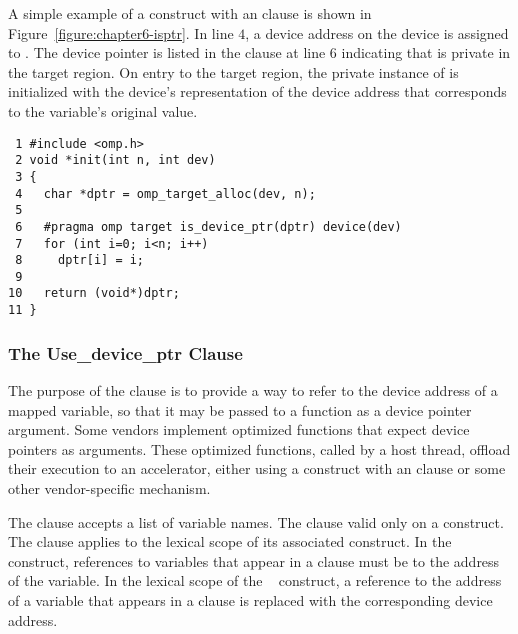 A simple example of a  construct with an 
clause is shown in Figure~\ref{figure:chapter6-isptr}.  In line $4$, a device
address on the  device is assigned to .  The device pointer 
is listed in the  clause at line $6$ indicating that 
is private in the target region.  On entry to the target region, the private instance
of  is initialized with the  device's representation of the device
address that corresponds to the variable's original value.

\begin{figure*}[!tb]
\begin{verbatim}
 1 #include <omp.h>
 2 void *init(int n, int dev)
 3 {
 4   char *dptr = omp_target_alloc(dev, n);
 5 
 6   #pragma omp target is_device_ptr(dptr) device(dev) 
 7   for (int i=0; i<n; i++)
 8     dptr[i] = i;
 9 
10   return (void*)dptr;
11 }
\end{verbatim}
\caption{ \textbf {Example of the is\_device\_ptr clause} -- \small
          The device pointer variable \texttt{dptr} must appear in
          the \texttt{is\_device\_ptr} clause to 
          de-reference it in the target region.
        }
\label{figure:chapter6-isptr}
\end{figure*}

\subsubsection{The Use\_device\_ptr Clause}
\label{ssec:06.use_device_ptr-clause}

The purpose of the  clause is
to provide a way to refer to the device address of a mapped variable,
so that it may be passed to a function as a device pointer argument.
Some vendors implement optimized functions that expect device pointers as
arguments.  These optimized functions, called by a host thread, offload their
execution to an accelerator, either using a  construct with an
 clause or some other vendor-specific mechanism.

The  clause accepts a list of variable names.  The clause
valid only on a  construct.  The clause applies to the
lexical scope of its associated  construct.  In
the construct, references to variables that appear in a  clause must
be to the address of the variable.  In the lexical scope of the
~ construct, a reference to the address of a variable
that appears in a  clause is replaced with the
corresponding device address.


